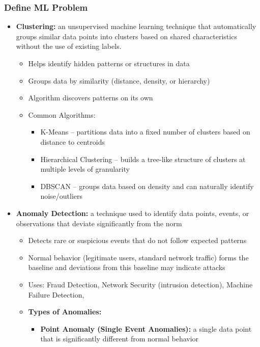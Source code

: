 \documentclass{article}
\begin{document}
\subsubsection{Define ML Problem}
\begin{itemize}
    \item \textbf{Clustering:} an unsupervised machine learning technique that automatically groups similar data points into clusters based on shared characteristics without the use of existing labels.
    \begin{itemize}
        \item Helps identify hidden patterns or structures in data 
        \item Groups data by similarity (distance, density, or hierarchy)
        \item Algorithm discovers patterns on its own
        \item Common Algorithms:
        \begin{itemize}
            \item K-Means – partitions data into a fixed number of clusters based on distance to centroids
            \item Hierarchical Clustering – builds a tree-like structure of clusters at multiple levels of granularity
            \item DBSCAN – groups data based on density and can naturally identify noise/outliers
        \end{itemize}
    \end{itemize}
    \item \textbf{Anomaly Detection:} a technique used to identify data points, events, or observations that deviate significantly from the norm 
    \begin{itemize}
        \item Detects rare or suspicious events that do not follow expected patterns
        \item Normal behavior (legitimate users, standard network traffic) forms the baseline and deviations from this baseline may indicate attacks
        \item Uses: Fraud Detection, Network Security (intrusion detection), Machine Failure Detection, 
        \item \textbf{Types of Anomalies: }
        \begin{itemize}
            \item \textbf{Point Anomaly (Single Event Anomalies):} a single data point that is significantly different from normal behavior

\end{itemize}
\end{itemize}
\end{itemize}
\end{document}
